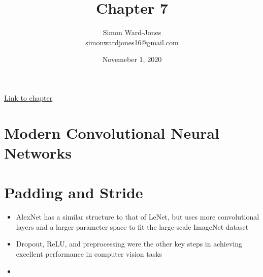 \documentclass[12pt,notitlepage]{article}
\begin{document}


\title{\Large{\textbf{Chapter 7}}}
\date{Novemeber 1, 2020}
\author{Simon Ward-Jones\\simonwardjones16@gmail.com}

\maketitle
\href{https://d2l.ai/chapter_convolutional-modern/index.html}{Link to chapter}

\section{Modern Convolutional Neural Networks}

\section{Padding and Stride}
\begin{itemize}
  \item AlexNet has a similar structure to that of LeNet, but uses more convolutional layers and a larger parameter space to fit the large-scale ImageNet dataset
  \item Dropout, ReLU, and preprocessing were the other key steps in achieving excellent performance in computer vision tasks
  \item 
\end{itemize}



\vfill

\nocite{zhang2020dive}
\end{document}
